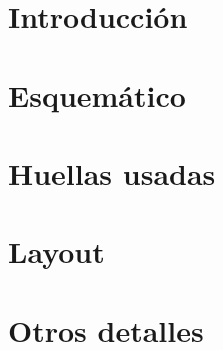 \section{Introducción}

\section{Esquemático}

\section{Huellas usadas}


\section{Layout}

\section{Otros detalles}